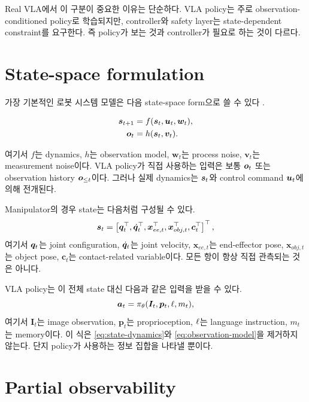 Real VLA에서 이 구분이 중요한 이유는 단순하다. VLA policy는 주로 observation-conditioned policy로 학습되지만, controller와 safety layer는 state-dependent constraint를 요구한다. 즉 policy가 보는 것과 controller가 필요로 하는 것이 다르다.

\section{State-space formulation}

가장 기본적인 로봇 시스템 모델은 다음 state-space form으로 쓸 수 있다 \cite{kalman1960,thrun2005}.

\begin{align}
  \bm{s}_{t+1} &= f(\bm{s}_t, \bm{u}_t, \bm{w}_t), \label{eq:state-dynamics}\\
  \bm{o}_t &= h(\bm{s}_t, \bm{v}_t). \label{eq:observation-model}
\end{align}

여기서 $f$는 dynamics, $h$는 observation model, $\bm{w}_t$는 process noise, $\bm{v}_t$는 measurement noise이다. VLA policy가 직접 사용하는 입력은 보통 $\bm{o}_t$ 또는 observation history $\bm{o}_{\leq t}$이다. 그러나 실제 dynamics는 $\bm{s}_t$와 control command $\bm{u}_t$에 의해 전개된다.

Manipulator의 경우 state는 다음처럼 구성될 수 있다.
\begin{equation}
  \bm{s}_t =
  \left[
  \bm{q}_t^\top,
  \dot{\bm{q}}_t^\top,
  \bm{x}_{ee,t}^\top,
  \bm{x}_{obj,t}^\top,
  \bm{c}_t^\top
  \right]^\top ,
  \label{eq:manipulator-state}
\end{equation}
여기서 $\bm{q}_t$는 joint configuration, $\dot{\bm{q}}_t$는 joint velocity, $\bm{x}_{ee,t}$는 end-effector pose, $\bm{x}_{obj,t}$는 object pose, $\bm{c}_t$는 contact-related variable이다. 모든 항이 항상 직접 관측되는 것은 아니다.

VLA policy는 이 전체 state 대신 다음과 같은 입력을 받을 수 있다.
\begin{equation}
  \bm{a}_t = \pi_\theta(\bm{I}_t, \bm{p}_t, \ell, m_t),
  \label{eq:image-policy}
\end{equation}
여기서 $\bm{I}_t$는 image observation, $\bm{p}_t$는 proprioception, $\ell$는 language instruction, $m_t$는 memory이다. 이 식은 \cref{eq:state-dynamics}와 \cref{eq:observation-model}을 제거하지 않는다. 단지 policy가 사용하는 정보 집합을 나타낼 뿐이다.

\section{Partial observability}

